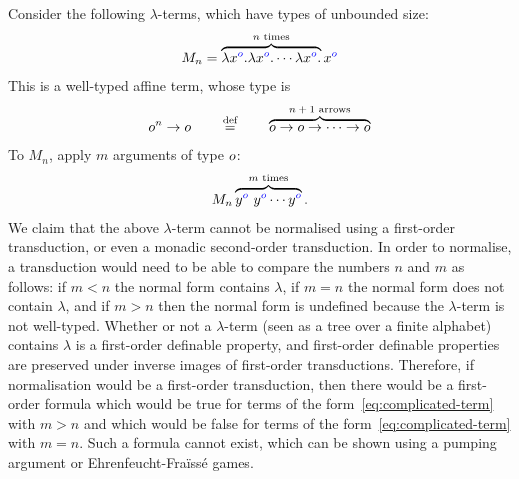 \begin{example}\label{ex:affine-not-enough}
Consider the following $\lambda$-terms, which have types of 
unbounded size: 
\begin{align*}
M_n = \overbrace{\lambda {x}^{{\color{blue}o}}. \lambda {x}^{{\color{blue}o}}. \cdots \lambda {x}^{{\color{blue}o}}.}^{\text{$n$ times}} {x}^{{\color{blue}o}}
\end{align*}
This is a well-typed affine term, whose type is 
\begin{align*}
o^n \to o \qquad \stackrel{\text{def}}= \qquad  \overbrace{o \to o \to \cdots \to o}^{\text{$n+1$ arrows}}
\end{align*}
    To $M_n$, apply  $m$ arguments of type $o$:
    \begin{align}\label{eq:complicated-term}
    M_n \overbrace{{y}^{{\color{blue}o}} \ {y}^{{\color{blue}o}} \cdots {y}^{{\color{blue}o}} }^{\text{$m$ times}}.
    \end{align}
    We claim that the above $\lambda$-term cannot be normalised using a first-order transduction, or even a monadic second-order transduction. In order to normalise, a transduction would need to be able to compare the numbers $n$ and $m$ as follows:  if $m < n$  the normal form contains $\lambda$, if $m=n$  the normal form does not contain $\lambda$, and if $m > n$ then the normal form is undefined because the $\lambda$-term is not well-typed.  Whether or not a $\lambda$-term (seen as a tree over a finite alphabet) contains $\lambda$ is a first-order definable property, and first-order definable properties are preserved under inverse images of first-order transductions. Therefore, if normalisation would be a first-order transduction,
then there would be a first-order formula which would be true for terms of the form~\eqref{eq:complicated-term} with $m>n$ and which would be false for terms of the form~\eqref{eq:complicated-term} with $m=n$. Such a formula cannot exist, which can be shown using a pumping argument or Ehrenfeucht-Fra\"iss\'e games. 
\end{example}

